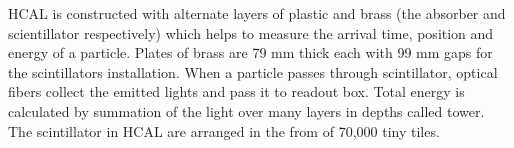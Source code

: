 HCAL is constructed with alternate layers of plastic and brass (the absorber and scientillator respectively) which helps to measure the arrival time, position and energy of a particle. 
Plates of brass are 79 mm thick each with 99 mm gaps for the scintillators installation.  
When a particle passes through scintillator, optical fibers collect the emitted lights and pass it to readout box. 
Total energy is calculated by summation of the light over many layers in depths
called tower. The scintillator in HCAL are arranged in the from of 70,000 tiny tiles. 
